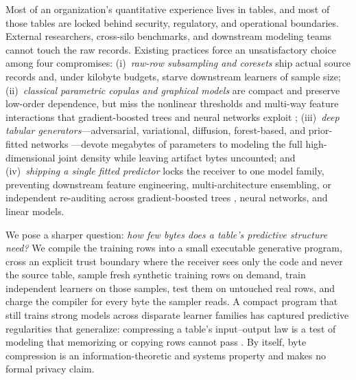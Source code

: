 Most of an organization's quantitative experience lives in tables, and most of those tables are locked
behind security, regulatory, and operational boundaries. External researchers, cross-silo benchmarks,
and downstream modeling teams cannot touch the raw records. Existing practices force an unsatisfactory
choice among four compromises:
(i)~\emph{raw-row subsampling and coresets} ship actual source records and, under kilobyte budgets,
starve downstream learners of sample size;
(ii)~\emph{classical parametric copulas and graphical models}
\citep{sklar1959,nelsen2006copulas,chow1968dependence,aas2009paircopula,patki2016sdv} are compact
and preserve low-order dependence, but miss the nonlinear thresholds and multi-way feature interactions
that gradient-boosted trees and neural networks exploit \citep{grinsztajn2022trees};
(iii)~\emph{deep tabular generators}---adversarial, variational, diffusion, forest-based, and
prior-fitted networks
\citep{xu2019ctgan,kotelnikov2023tabddpm,zhang2024tabsyn,shi2025tabdiff,watson2023arf,jolicoeurmartineau2024forestdiffusion,borisov2023great,hollmann2023tabpfn,hollmann2025tabpfn,fey2025kumo,borisov2024survey}---devote
megabytes of parameters to modeling the full high-dimensional joint density while leaving artifact bytes
uncounted; and
(iv)~\emph{shipping a single fitted predictor} locks the receiver to one model family, preventing
downstream feature engineering, multi-architecture ensembling, or independent re-auditing across
gradient-boosted trees \citep{prokhorenkova2018catboost,chen2016xgboost,ke2017lightgbm}, neural
networks, and linear models.

We pose a sharper question: \emph{how few bytes does a table's predictive structure need?} We
compile the training rows into a small executable generative program, cross an explicit trust boundary
where the receiver sees only the code and never the source table, sample fresh synthetic training rows on
demand, train independent learners on those samples, test them on untouched real rows, and charge the
compiler for every byte the sampler reads. A compact program that still trains strong models across
disparate learner families has captured predictive regularities that generalize: compressing a table's
input--output law is a test of modeling that memorizing or copying rows cannot pass
\citep{rissanen1978modeling,blumer1987occam,tishby2000bottleneck,shannon1959coding,balle2017endtoend}.
By itself, byte compression is an information-theoretic and systems property and makes no formal
privacy claim.

